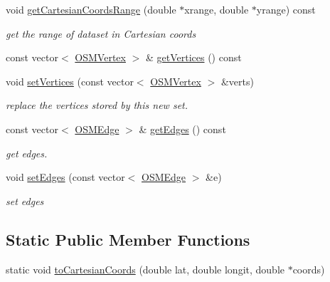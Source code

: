 \begin{DoxyCompactItemize}
\item 
void \mbox{\hyperlink{classbridges_1_1dataset_1_1_o_s_m_data_aa3341a32cd37df602b6f53f2e3cab92b}{get\+Cartesian\+Coords\+Range}} (double $\ast$xrange, double $\ast$yrange) const
\begin{DoxyCompactList}\small\item\em get the range of dataset in Cartesian coords \end{DoxyCompactList}\item 
const vector$<$ \mbox{\hyperlink{classbridges_1_1dataset_1_1_o_s_m_vertex}{O\+S\+M\+Vertex}} $>$ \& \mbox{\hyperlink{classbridges_1_1dataset_1_1_o_s_m_data_a193ff44cf3871a6ef4c4194fa450c5be}{get\+Vertices}} () const
\item 
void \mbox{\hyperlink{classbridges_1_1dataset_1_1_o_s_m_data_aa146cdbf046fa06cd16f654518e3f4e2}{set\+Vertices}} (const vector$<$ \mbox{\hyperlink{classbridges_1_1dataset_1_1_o_s_m_vertex}{O\+S\+M\+Vertex}} $>$ \&verts)
\begin{DoxyCompactList}\small\item\em replace the vertices stored by this new set. \end{DoxyCompactList}\item 
const vector$<$ \mbox{\hyperlink{classbridges_1_1dataset_1_1_o_s_m_edge}{O\+S\+M\+Edge}} $>$ \& \mbox{\hyperlink{classbridges_1_1dataset_1_1_o_s_m_data_afdc974e2356643768024ebaae985ef24}{get\+Edges}} () const
\begin{DoxyCompactList}\small\item\em get edges. \end{DoxyCompactList}\item 
void \mbox{\hyperlink{classbridges_1_1dataset_1_1_o_s_m_data_a42b2ef6edfd00c224949233f6bf18602}{set\+Edges}} (const vector$<$ \mbox{\hyperlink{classbridges_1_1dataset_1_1_o_s_m_edge}{O\+S\+M\+Edge}} $>$ \&e)
\begin{DoxyCompactList}\small\item\em set edges \end{DoxyCompactList}\end{DoxyCompactItemize}
\subsection*{Static Public Member Functions}
\begin{DoxyCompactItemize}
\item 
static void \mbox{\hyperlink{classbridges_1_1dataset_1_1_o_s_m_data_a519483237352f16f0405137138ee2bd1}{to\+Cartesian\+Coords}} (double lat, double longit, double $\ast$coords)
\end{DoxyCompactItemize}


